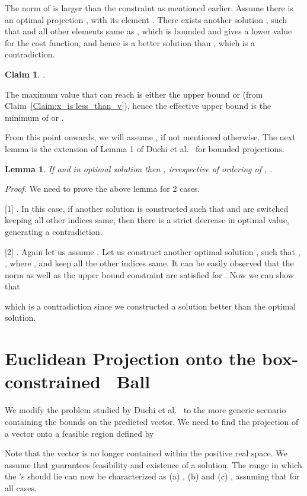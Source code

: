 \documentclass{article}
\newtheorem{lemma}{Lemma}
\newtheorem{claim}{Claim}
\def\Lo{~}
\begin{document}
The norm of  is larger than the constraint  as mentioned earlier. Assume there is an optimal projection , with its element . There exists another solution , such that  and all other elements same as , which is bounded and gives a lower value for the cost function, and hence is a better solution than , which is a contradiction.

\begin{claim}\label{Claim:effective_lb}
.
\end{claim}

The maximum value that  can reach is either the upper bound  or  (from Claim~\ref{Claim:x_is less_than_v}), hence the effective upper bound  is the minimum of  or .


From this point onwards, we will assume , if not mentioned otherwise.
The next lemma is the extension of Lemma 1 of Duchi et al.~\cite{Duchi08} for bounded projections.
\begin{lemma}\label{Lemma:v_based_zero_constraint_ordering}
If  and in optimal solution  then , irrespective of ordering of , .
\end{lemma}
\emph{Proof.} We need to prove the above lemma for 2 cases.

[1] . In this case, if another solution is constructed such that  and  are switched keeping all other indices same, then there is a strict decrease in optimal value, generating a contradiction.

[2] . Again let us assume . Let us construct another optimal solution , such that , , where , and keep all the other indices same. It can be easily observed that the norm as well as the upper bound constraint are satisfied for . Now we can show that

which is a contradiction since we constructed a solution better than the optimal solution.


\section{Euclidean Projection onto the box-constrained \Lo Ball}\label{SEC:EPL1}
We modify the problem studied by Duchi et al.~\cite{Duchi08} to the more generic scenario containing the bounds on the predicted vector. We need to find the projection of a vector  onto a feasible region defined by

Note that the vector  is no longer contained within the positive real space. We assume that  guarantees feasibility and existence of a solution.
The range in which the 's should lie can now be characterized as (a) , (b)  and (c) , assuming that  for all cases.
\end{document}
